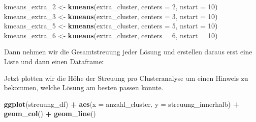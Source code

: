\documentclass[12pt,ngerman,]{book}
\makeatletter
\newenvironment{Shaded}{\begin{snugshade}}{\end{snugshade}}
\newcommand{\KeywordTok}[1]{\textcolor[rgb]{0.13,0.29,0.53}{\textbf{#1}}}
\newcommand{\DataTypeTok}[1]{\textcolor[rgb]{0.13,0.29,0.53}{#1}}
\newcommand{\DecValTok}[1]{\textcolor[rgb]{0.00,0.00,0.81}{#1}}
\newcommand{\StringTok}[1]{\textcolor[rgb]{0.31,0.60,0.02}{#1}}
\newcommand{\OperatorTok}[1]{\textcolor[rgb]{0.81,0.36,0.00}{\textbf{#1}}}
\newcommand{\NormalTok}[1]{#1}
\newenvironment{kframe}{%
\medskip{}
\setlength{\fboxsep}{.8em}
 \def\at@end@of@kframe{}%
 \ifinner\ifhmode%
  \def\at@end@of@kframe{\end{minipage}}%
  \begin{minipage}{\columnwidth}%
 \fi\fi%
 \def\FrameCommand##1{\hskip\@totalleftmargin \hskip-\fboxsep
 \colorbox{shadecolor}{##1}\hskip-\fboxsep
     \hskip-\linewidth \hskip-\@totalleftmargin \hskip\columnwidth}%
 \MakeFramed {\advance\hsize-\width
   \@totalleftmargin\z@ \linewidth\hsize
   \@setminipage}}%
 {\par\unskip\endMakeFramed%
 \at@end@of@kframe}
\renewenvironment{Shaded}{\begin{kframe}}{\end{kframe}}
\theoremstyle{definition}
\theoremstyle{definition}
\theoremstyle{remark}
\makeatother
\begin{document}
\begin{Shaded}
\begin{Highlighting}[]
\NormalTok{kmeans_extra_}\DecValTok{2}\NormalTok{ <-}\StringTok{ }\KeywordTok{kmeans}\NormalTok{(extra_cluster, }\DataTypeTok{centers =} \DecValTok{2}\NormalTok{, }\DataTypeTok{nstart =} \DecValTok{10}\NormalTok{)}
\NormalTok{kmeans_extra_}\DecValTok{3}\NormalTok{ <-}\StringTok{ }\KeywordTok{kmeans}\NormalTok{(extra_cluster, }\DataTypeTok{centers =} \DecValTok{3}\NormalTok{, }\DataTypeTok{nstart =} \DecValTok{10}\NormalTok{)}
\NormalTok{kmeans_extra_}\DecValTok{5}\NormalTok{ <-}\StringTok{ }\KeywordTok{kmeans}\NormalTok{(extra_cluster, }\DataTypeTok{centers =} \DecValTok{5}\NormalTok{, }\DataTypeTok{nstart =} \DecValTok{10}\NormalTok{)}
\NormalTok{kmeans_extra_}\DecValTok{6}\NormalTok{ <-}\StringTok{ }\KeywordTok{kmeans}\NormalTok{(extra_cluster, }\DataTypeTok{centers =} \DecValTok{6}\NormalTok{, }\DataTypeTok{nstart =} \DecValTok{10}\NormalTok{)}
\end{Highlighting}
\end{Shaded}

Dann nehmen wir die Gesamtstreuung jeder Lösung und erstellen daraus
erst eine Liste und dann einen Dataframe:

\begin{Shaded}
\end{Shaded}

Jetzt plotten wir die Höhe der Streuung pro Clusteranalyse um einen
Hinweis zu bekommen, welche Lösung am besten passen könnte.

\begin{Shaded}
\begin{Highlighting}[]
\KeywordTok{ggplot}\NormalTok{(streuung_df) }\OperatorTok{+}
\StringTok{  }\KeywordTok{aes}\NormalTok{(}\DataTypeTok{x =}\NormalTok{ anzahl_cluster,}
      \DataTypeTok{y =}\NormalTok{ streuung_innerhalb) }\OperatorTok{+}
\StringTok{  }\KeywordTok{geom_col}\NormalTok{() }\OperatorTok{+}
\StringTok{  }\KeywordTok{geom_line}\NormalTok{()}
\end{Highlighting}
\end{Shaded}
\end{document}

